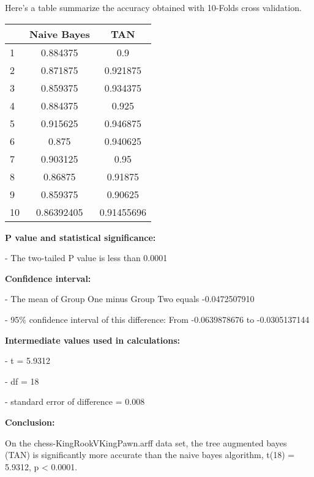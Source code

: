 \documentclass[paper=a4, fontsize=11pt]{scrartcl} %
\numberwithin{equation}{section} %
\numberwithin{figure}{section} %
\numberwithin{table}{section} %
\begin{document}
Here's a table summarize the accuracy obtained with 10-Folds cross validation. 

\begin{center}
  \begin{tabular}{ l |c|c}
    \hline
 	& Naive Bayes &TAN \\ \hline
	1 & 0.884375   & 0.9   \\ 	\hline     
	2 &  0.871875   & 0.921875  \\ 	\hline
	3 &  0.859375  &  0.934375  \\ 	\hline
	4 &  0.884375 &   0.925     \\ 	\hline
	5 & 0.915625  &  0.946875  \\ 	\hline
	6 & 0.875     &  0.940625  \\ 	\hline
	7 & 0.903125  &  0.95      \\ 	\hline
	8 & 0.86875   &  0.91875   \\ 	\hline
	9 & 0.859375  &  0.90625   \\ 	\hline
	10 & 0.86392405 & 0.91455696\\ 	\hline
  \end{tabular}
\end{center}

\bigbreak


\textbf{P value and statistical significance: }

-  The two-tailed P value is less than 0.0001 


\textbf{Confidence interval: }

-  The mean of Group One minus Group Two equals -0.0472507910 

-  95\% confidence interval of this difference: From -0.0639878676 to -0.0305137144 

\textbf{Intermediate values used in calculations: }

-  t = 5.9312 

-  df = 18 

-  standard error of difference = 0.008 

\bigbreak

\textbf{Conclusion:}

On the chess-KingRookVKingPawn.arff data set, the tree augmented bayes (TAN) is significantly more accurate than the naive bayes algorithm, t(18) = 5.9312, p < 0.0001. 
\end{document}
